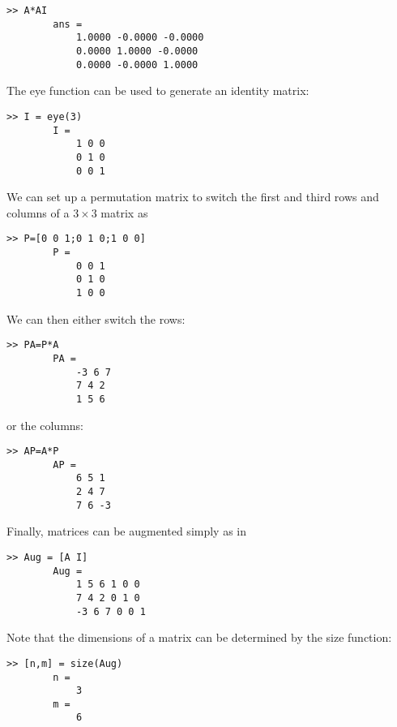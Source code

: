 \documentclass[../main.tex]{subfiles}
\begin{document}
\begin{example}
    \begin{lstlisting}[numbers=none,frame=none]
        >> A*AI
        ans =
            1.0000 -0.0000 -0.0000
            0.0000 1.0000 -0.0000
            0.0000 -0.0000 1.0000
	\end{lstlisting}

    \noindent The eye function can be used to generate an identity matrix:

    
    \begin{lstlisting}[numbers=none,frame=none]
        >> I = eye(3)
        I =
            1 0 0
            0 1 0
            0 0 1
	\end{lstlisting}

    \noindent We can set up a permutation matrix to switch the first and third rows and columns of a $3 \times 3$ matrix as

    \begin{lstlisting}[numbers=none,frame=none]
        >> P=[0 0 1;0 1 0;1 0 0]
        P =
            0 0 1
            0 1 0
            1 0 0
	\end{lstlisting}

    \noindent We can then either switch the rows:

    \begin{lstlisting}[numbers=none,frame=none]
        >> PA=P*A
        PA =
            -3 6 7
            7 4 2
            1 5 6
	\end{lstlisting}

    \noindent or the columns:

    \begin{lstlisting}[numbers=none,frame=none]
        >> AP=A*P
        AP =
            6 5 1
            2 4 7
            7 6 -3
	\end{lstlisting}

    Finally, matrices can be augmented simply as in

    \begin{lstlisting}[numbers=none,frame=none]
        >> Aug = [A I]
        Aug =
            1 5 6 1 0 0
            7 4 2 0 1 0
            -3 6 7 0 0 1
	\end{lstlisting}

    \noindent Note that the dimensions of a matrix can be determined by the size function:

    \begin{lstlisting}[numbers=none,frame=none]
        >> [n,m] = size(Aug)
        n =
            3
        m =
            6
	\end{lstlisting}
\end{example}
\end{document}
